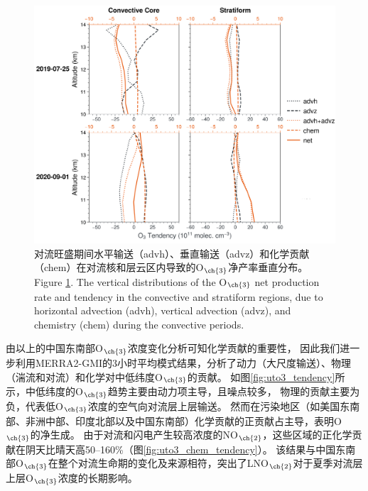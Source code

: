 \begin{figure}[H]
\centering
\includegraphics[width=\textwidth]{./figures/tendency_o3_classification.png}
\caption{
对流旺盛期间水平输送（advh）、垂直输送（advz）和化学贡献（chem）在对流核和层云区内导致的O$_{\ch{3}}$净产率垂直分布。
\\
Figure \ref{fig:tendency_o3_classification}. The vertical distributions of the O$_{\ch{3}}$ net production rate and tendency in the convective and stratiform regions, due to horizontal advection (advh), vertical advection (advz), and chemistry (chem) during the convective periods.
}
\label{fig:tendency_o3_classification}
\end{figure}

由以上的中国东南部O$_{\ch{3}}$浓度变化分析可知化学贡献的重要性，
因此我们进一步利用MERRA2-GMI的3小时平均模式结果，分析了动力（大尺度输送）、物理（湍流和对流）和化学对中低纬度O$_{\ch{3}}$的贡献。
如图\ref{fig:uto3_tendency}所示，中低纬度的O$_{\ch{3}}$趋势主要由动力项主导，且噪点较多，
物理的贡献主要为负，代表低O$_{\ch{3}}$浓度的空气向对流层上层输送。
然而在污染地区（如美国东南部、非洲中部、印度北部以及中国东南部）化学贡献的正贡献占主导，表明O$_{\ch{3}}$的净生成。
由于对流和闪电产生较高浓度的NO$_{\ch{2}}$，这些区域的正化学贡献在阴天比晴天高50--160\%（图\ref{fig:uto3_chem_tendency}）。
该结果与中国东南部O$_{\ch{3}}$在整个对流生命期的变化及来源相符，突出了LNO$_{\ch{2}}$对于夏季对流层上层O$_{\ch{3}}$浓度的长期影响。


